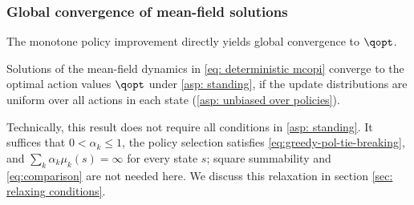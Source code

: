 \subsubsection{Global convergence of mean-field solutions}

The monotone policy improvement directly yields global convergence to $\qopt$.

\begin{proposition}
\label{thm: convergence deterministic mcopi}
    Solutions of the mean-field dynamics in \eqref{eq: deterministic mcopi} converge to the optimal action values $\qopt$
    under \autoref{asp: standing},
    if the update distributions are uniform over all actions in each state (\autoref{asp: unbiased over policies}).
\end{proposition}

Technically, this result does not require all conditions in \autoref{asp: standing}. It suffices that $0<\alpha_k\le1$, the policy selection satisfies \eqref{eq:greedy-pol-tie-breaking}, and $\sum_k\alpha_k\mu_k(s)=\infty$ for every state $s$; square summability and \eqref{eq:comparison} are not needed here. We discuss this relaxation in section \ref{sec: relaxing conditions}.






